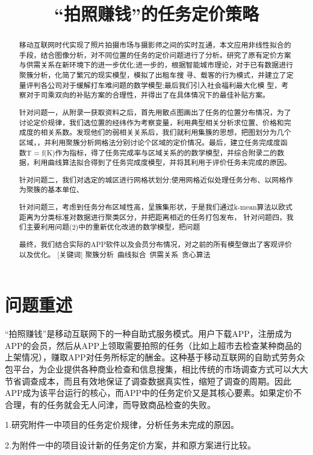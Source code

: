 \documentclass{ctexart}
\title{“拍照赚钱”的任务定价策略}
\date{}
\begin{document}
\maketitle
\begin{abstract}
移动互联网时代实现了照片拍摄市场与摄影师之间的实时互通，本文应用非线性拟合的手段，结合图像分析，对不同位置的任务的定价问题进行了分析。研究了原有定价方案与供需关系在新环境下的进一步优化;进一步的，根据智能城市理论，对于已有数据进行聚簇分析，化简了繁冗的现实模型，模拟了出租车搜 寻、载客的行为模式，并建立了定量评判各公司对于缓解打车难问题的数学模型;最后我们引入社会福利最大化模 型，考察对于司乘双向的补贴方案的合理性，并得出了在具体情况下的最佳补贴方案。

针对问题一，从附录一获取资料之后，首先用散点图画出了任务的位置分布情况，为了讨论定价规律，我们选位置的经纬作为考察变量，利用典型相关分析求位置、价格和完成度的相关系数。发现他们的弱相关关系后，我们就利用集簇的思想，把图划分为几个区域，，并利用聚簇分析网格法分别讨论个区域的定价情况。最后，建立任务完成度函数T = f(K)作为指标，得了任务完成率与区域关系的的数学模型，并综合附录二的数据，利用曲线算法拟合得到了任务完成度模型，并将其利用于评价任务未完成的原因。

针对问题二，我们对选定的城区进行网格状划分;使用网格近似处理任务分布、以网格作为聚簇的基本单位、

针对问题三，考虑到任务分布区域性高，呈簇集形状，于是我们通过k-mean算法以欧式距离为分类标准对数据进行聚类区分，并把距离相近的任务打包发布，
针对问题四，我们主要利用问题(2)中的重新优化改进的数学模型，把问题

最终，我们结合实际的APP软件以及会员分布情况，对之前的所有模型做出了客观评价以及优化。
[关键词] 聚簇分析\ 曲线拟合\ 供需关系\ 贪心算法\ 
\end{abstract}
\newpage
\section{问题重述}
“拍照赚钱”是移动互联网下的一种自助式服务模式。用户下载APP，注册成为APP的会员，然后从APP上领取需要拍照的任务（比如上超市去检查某种商品的上架情况），赚取APP对任务所标定的酬金。这种基于移动互联网的自助式劳务众包平台，为企业提供各种商业检查和信息搜集，相比传统的市场调查方式可以大大节省调查成本，而且有效地保证了调查数据真实性，缩短了调查的周期。因此APP成为该平台运行的核心，而APP中的任务定价又是其核心要素。如果定价不合理，有的任务就会无人问津，而导致商品检查的失败。

1.研究附件一中项目的任务定价规律，分析任务未完成的原因。

2.为附件一中的项目设计新的任务定价方案，并和原方案进行比较。
\end{document}
